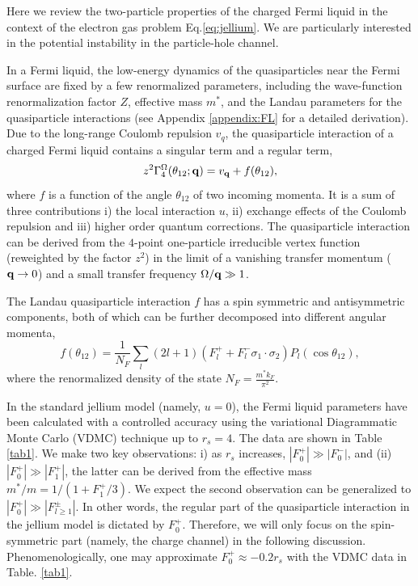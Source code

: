 \documentclass[reprint,amsmath,amssymb,aps,prb]{revtex4-1}
\begin{document}
Here we review the two-particle properties of the charged Fermi liquid in the context of the electron gas problem Eq.\eqref{eq:jellium}. We are particularly interested in the potential instability in the particle-hole channel.

In a Fermi liquid, the low-energy dynamics of the quasiparticles near the Fermi surface are fixed by a few renormalized parameters, including the wave-function renormalization factor $Z$, effective mass $m^*$, and the Landau parameters for the quasiparticle interactions (see Appendix \ref{appendix:FL} for a detailed derivation).
Due to the long-range Coulomb repulsion $v_q$, the quasiparticle interaction of a charged Fermi liquid contains a singular term and a regular term,
\begin{equation}
    z^2 \Gamma_4^\Omega (\theta_{12}; \mathbf{q})=v_{\mathbf{q}}+f(\theta_{12}),
\end{equation}
where $f$ is a function of the angle $\theta_{12}$ of two incoming momenta. It is a sum of three contributions i) the local interaction $u$, ii) exchange effects of the Coulomb repulsion and iii) higher order quantum corrections. The quasiparticle interaction can be derived from the $4$-point one-particle irreducible vertex function (reweighted by the factor $z^2$) in the limit of a vanishing transfer momentum ($\mathbf{q} \rightarrow 0$) and a small transfer frequency $\Omega/\mathbf{q} \gg 1$.

The Landau quasiparticle interaction $f$ has a spin symmetric and antisymmetric components, both of which can be further decomposed into different angular momenta,
\begin{equation}
    f(\theta_{12})=\frac{1}{N_F}\sum_l (2l+1) (F_l^++F_l^-\sigma_1\cdot\sigma_2) P_l(\cos\theta_{12}),
\end{equation}
where the renormalized density of the state $N_F=\frac{m^*k_F}{\pi^2}$.

In the standard jellium model (namely, $u=0$), the Fermi liquid parameters have been calculated with a controlled accuracy using the variational Diagrammatic Monte Carlo (VDMC) technique up to $r_s=4$. The data are shown in Table \ref{tab1}. We make two key observations: i) as $r_s$ increases, $|F^+_0| \gg |F^-_0|$, and (ii) $|F^+_0| \gg |F^+_1|$, the latter can be derived from the effective mass $m^*/m=1/(1+F^+_1/3)$. We expect the second observation can be generalized to $|F^+_0| \gg |F^{\pm}_{l\ge 1}|$. In other words, the regular part of the quasiparticle interaction in the jellium model is dictated by $F^+_0$. Therefore, we will only focus on the spin-symmetric part (namely, the charge channel) in the following discussion. Phenomenologically, one may approximate $F^+_0 \approx -0.2r_s$ with the VDMC data in Table. \ref{tab1}.
\end{document}
